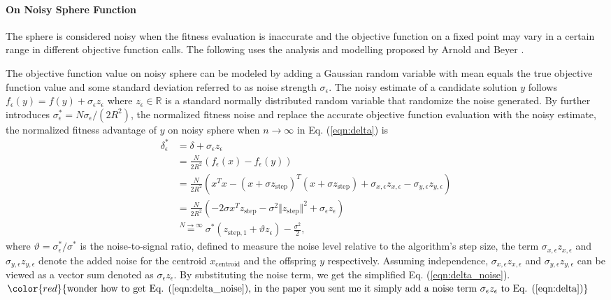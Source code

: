 \paragraph{On Noisy Sphere Function}
The sphere is considered noisy when the fitness evaluation is inaccurate and the objective function on a fixed point may vary in a certain range in different objective function calls. The following uses the analysis and modelling proposed by Arnold and Beyer \cite{ARNOLD2001127}. 

The objective function value on noisy sphere can be modeled by adding a Gaussian random variable with mean equals the true objective function value and some standard deviation referred to as noise strength $\sigma_\epsilon$. The noisy estimate of a candidate solution $y$ follows $f_{\epsilon}(y) = f(y) + \sigma_{\epsilon}z_\epsilon$ where $z_\epsilon \in \mathbb{R}$ is a standard normally distributed random variable that randomize the noise generated. By further introduces $\sigma_\epsilon^* = N \sigma_\epsilon / (2R^2)$, the normalized fitness noise \cite{1284729} and replace the accurate objective function evaluation with the noisy estimate, the normalized fitness advantage of $y$ on noisy sphere when $n \rightarrow \infty$ in Eq. (\ref{eqn:delta}) is
\begin{align}
\delta_\epsilon^* & = \delta + \sigma_\epsilon z_\epsilon\\
&=  \frac{N}{2R^2}\left( f_\epsilon (x) - f_\epsilon(y)\right)  \nonumber\\ 
& = \frac{N}{2R^2} (x^Tx - (x+\sigma z_{\text{step}})^T (x+\sigma z_{\text{step}}) +\sigma_{x,\epsilon} z_{x,\epsilon}-\sigma_{y,\epsilon} z_{y,\epsilon}) \nonumber\\
& = \frac{N}{2R^2} (-2 \sigma x^Tz_{\text{step}} - \sigma^2 \Vert z_{\text{step}}\Vert^2 +\sigma_\epsilon z_\epsilon) \nonumber\\
&\overset{N \rightarrow \infty}{=} \sigma^* (z_{\text{step},1} + \vartheta z_\epsilon ) - \frac{\sigma^2}{2}, \label{eqn:delta_noise}{}
\end{align}
where $\vartheta = \sigma_\epsilon^*/\sigma^*$ is the noise-to-signal ratio, defined to measure the noise level relative to the algorithm's step size, the term $\sigma_{x,\epsilon} z_{x,\epsilon}$ and $\sigma_{y,\epsilon} z_{y,\epsilon}$ denote the added noise for the centroid $x_{\text{centroid}}$ and the offspring $y$ respectively. Assuming independence, $\sigma_{x,\epsilon} z_{x,\epsilon}$ and $\sigma_{y,\epsilon} z_{y,\epsilon}$ can be viewed as a vector sum denoted as $\sigma_\epsilon z_\epsilon$. By substituting the noise term, we get the simplified Eq. (\ref{eqn:delta_noise}).
$\color{red}{\text{wonder how to get Eq. (\ref{eqn:delta_noise}), in the paper you sent me it simply add a noise term } \sigma_\epsilon z_\epsilon \text{ to Eq. (\ref{eqn:delta})}}$


